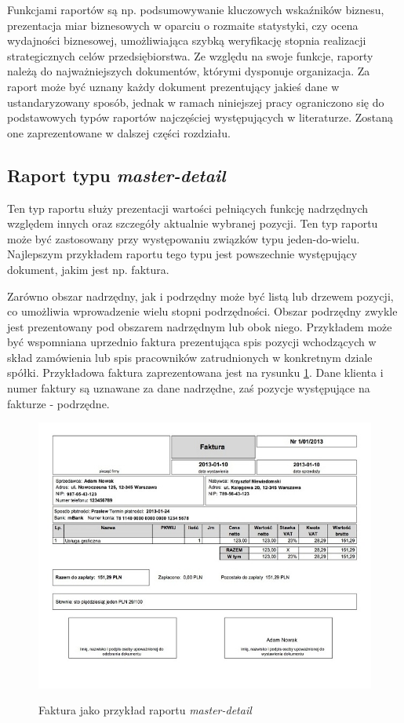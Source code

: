 \documentclass[11pt,a4paper]{article}
\begin{document}
Funkcjami raportów są np. podsumowywanie kluczowych wskaźników biznesu, prezentacja miar biznesowych w oparciu o rozmaite statystyki, czy ocena wydajności biznesowej, umożliwiająca szybką weryfikację stopnia realizacji strategicznych celów przedsiębiorstwa. Ze względu na swoje funkcje, raporty należą do najważniejszych dokumentów, którymi dysponuje organizacja. 
Za raport może być uznany każdy dokument prezentujący jakieś dane w ustandaryzowany sposób, jednak w ramach niniejszej pracy ograniczono się do podstawowych typów raportów najczęściej występujących w literaturze. Zostaną one zaprezentowane w dalszej części rozdziału.

\subsection{Raport typu \emph{master-detail}} \label{teoria:md}
Ten typ raportu służy prezentacji wartości pełniących funkcję nadrzędnych względem innych oraz szczegóły aktualnie wybranej pozycji. Ten typ raportu może być zastosowany przy występowaniu związków typu jeden-do-wielu. Najlepszym przykładem raportu tego typu jest powszechnie występujący dokument, jakim jest np. faktura. 

Zarówno obszar nadrzędny, jak i podrzędny może być listą lub drzewem pozycji, co umożliwia wprowadzenie wielu stopni podrzędności. Obszar podrzędny zwykle jest prezentowany pod obszarem nadrzędnym lub obok niego. Przykładem może być wspomniana uprzednio faktura prezentująca spis pozycji wchodzących w skład zamówienia lub spis pracowników zatrudnionych w konkretnym dziale spółki. Przykładowa faktura zaprezentowana jest na rysunku \ref{img:faktura}. Dane klienta i numer faktury są uznawane za dane nadrzędne, zaś pozycje występujące na fakturze - podrzędne. 

\begin{figure}[h]
\centering
\caption{Faktura jako przykład raportu \emph{master-detail}}
\includegraphics[scale=0.80]{faktura_vat_pdf}
\label{img:faktura}
\end{figure}
\end{document}
